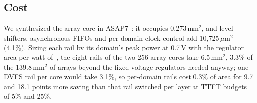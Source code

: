 \subsection{Cost}
We synthesized the array core in ASAP7~\cite{asap7}: it occupies 0.273\,mm$^2$, and level shifters, asynchronous FIFOs and per-domain clock control add 10{,}725\,$\mu$m$^2$ (4.1\%).
Sizing each rail by its domain's peak power at 0.7\,V with the regulator area per watt of~\cite{xue2026finedvfs}, the eight rails of the two 256-array cores take 6.5\,mm$^2$, 3.3\% of the 139.8\,mm$^2$ of arrays beyond the fixed-voltage regulators needed anyway; one DVFS rail per core would take 3.1\%, so per-domain rails cost 0.3\% of area for 9.7 and 18.1 points more saving than that rail switched per layer at TTFT budgets of 5\% and 25\%.
